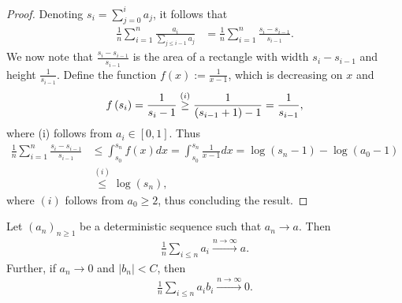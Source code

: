 \begin{proof}
    Denoting $s_i = \sum_{j= 0}^{i} a_j$, it follows that
    \begin{align*}
        \frac{1}{n}\sum_{i = 1}^n \frac{a_i}{\sum_{j \leq i-1} a_{j}} &= \frac{1}{n}\sum_{i = 1}^n \frac{s_i - s_{i-1}}{s_{i-1}}.
    \end{align*}
    We now note that $\frac{s_i - s_{i-1}}{s_{i-1}}$ is the area of a rectangle with width $s_i - s_{i-1}$ and height $\frac{1}{s_{i-1}}$. Define the function $f(x) := \frac{1}{x-1}$, which is decreasing on $x$ and 
    \begin{align*}
        f\left( s_{i}\right) = \frac{1}{s_{i} - 1} \stackrel{(i)}{\geq} \frac{1}{(s_{i-1} + 1) - 1} = \frac{1}{s_{i-1}},
    \end{align*}
    where (i) follows from $a_i \in [0,1]$. Thus
    \begin{align*}
        \frac{1}{n}\sum_{i = 1}^n \frac{s_i - s_{i-1}}{s_{i-1}} &\leq \int_{s_0}^{s_n} f(x) dx = \int_{s_0}^{s_n} \frac{1}{x-1} dx = \log (s_n - 1) - \log (a_0 - 1) 
        \\&\stackrel{(i)}{\leq} \log (s_n),
    \end{align*}
    where $(i)$ follows from $a_0 \geq 2$, thus concluding the result.
\end{proof}


\begin{lemma} \label{lemma:average_of_converging_sequence}
    Let $(a_{n})_{n \geq 1}$ be a deterministic sequence such that $a_n \to a$. Then
    \begin{align*}
        \frac{1}{n} \sum_{i \leq n}a_{i} \stackrel{n\to\infty}{\to} a.
    \end{align*}
    Further, if $a_n \to 0$ and $|b_n|<C$, then
    \begin{align*}
        \frac{1}{n} \sum_{i \leq n}a_{i} b_i \stackrel{n\to\infty}{\to} 0.
    \end{align*}
\end{lemma}

